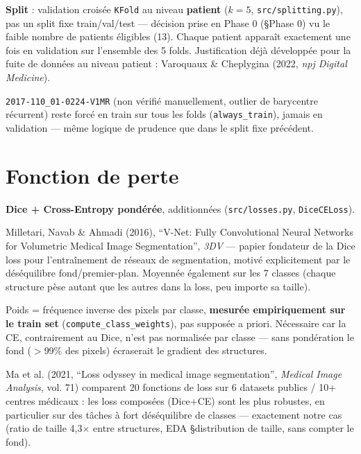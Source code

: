 \textbf{Split} : validation croisée \texttt{KFold} au niveau \textbf{patient} ($k=5$,
\texttt{src/splitting.py}), pas un split fixe train/val/test --- décision prise en
Phase 0 (\S Phase 0) vu le faible nombre de patients éligibles (13). Chaque patient
apparaît exactement une fois en validation sur l'ensemble des 5 folds. Justification
déjà développée pour la fuite de données au niveau patient : Varoquaux \& Cheplygina
(2022, \emph{npj Digital Medicine}).

\texttt{2017-110\_01-0224-V1MR} (non vérifié manuellement, outlier de barycentre
récurrent) reste forcé en train sur tous les folds (\texttt{always\_train}), jamais en
validation --- même logique de prudence que dans le split fixe précédent.

\section{Fonction de perte}
\label{sec:phase1-loss}

\textbf{Dice + Cross-Entropy pondérée}, additionnées (\texttt{src/losses.py},
\texttt{DiceCELoss}).

\begin{description}[style=nextline]
    \item[Dice loss] Milletari, Navab \& Ahmadi (2016), ``V-Net: Fully Convolutional
        Neural Networks for Volumetric Medical Image Segmentation'', \emph{3DV} ---
        papier fondateur de la Dice loss pour l'entraînement de réseaux de
        segmentation, motivé explicitement par le déséquilibre fond/premier-plan.
        Moyennée également sur les 7 classes (chaque structure pèse autant que les
        autres dans la loss, peu importe sa taille).
    \item[Cross-Entropy pondérée] Poids = fréquence inverse des pixels par classe,
        \textbf{mesurée empiriquement sur le train set} (\texttt{compute\_class\_weights}),
        pas supposée a priori. Nécessaire car la CE, contrairement au Dice, n'est pas
        normalisée par classe --- sans pondération le fond ($>$99\% des pixels)
        écraserait le gradient des structures.
    \item[Pourquoi combiner les deux] Ma et al. (2021, ``Loss odyssey in medical image
        segmentation'', \emph{Medical Image Analysis}, vol. 71) comparent 20 fonctions
        de loss sur 6 datasets publics / 10+ centres médicaux : les loss composées
        (Dice+CE) sont les plus robustes, en particulier sur des tâches à fort
        déséquilibre de classes --- exactement notre cas (ratio de taille 4,3× entre
        structures, EDA \S distribution de taille, sans compter le fond).
\end{description}

